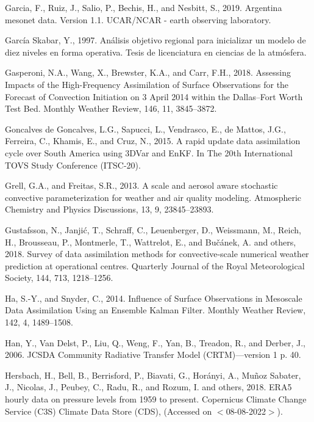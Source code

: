 \documentclass[12pt,oneside]{reedthesis}
\begin{document}
\leavevmode\hypertarget{ref-garcia2019}{}%
Garcia, F., Ruiz, J., Salio, P., Bechis, H., and Nesbitt, S., 2019. Argentina mesonet data. Version 1.1. UCAR/NCAR - earth observing laboratory.

\leavevmode\hypertarget{ref-garciaskabar1997}{}%
García Skabar, Y., 1997. Análisis objetivo regional para inicializar un modelo de diez niveles en forma operativa. Tesis de licenciatura en ciencias de la atmósfera.

\leavevmode\hypertarget{ref-gasperoni2018}{}%
Gasperoni, N.A., Wang, X., Brewster, K.A., and Carr, F.H., 2018. Assessing Impacts of the High-Frequency Assimilation of Surface Observations for the Forecast of Convection Initiation on 3 April 2014 within the Dallas--Fort Worth Test Bed. Monthly Weather Review, 146, 11, 3845--3872.

\leavevmode\hypertarget{ref-goncalvesdegoncalves2015}{}%
Goncalves de Goncalves, L.G., Sapucci, L., Vendrasco, E., de Mattos, J.G., Ferreira, C., Khamis, E., and Cruz, N., 2015. A rapid update data assimilation cycle over South America using 3DVar and EnKF. In The 20th International TOVS Study Conference (ITSC-20).

\leavevmode\hypertarget{ref-grell2013}{}%
Grell, G.A., and Freitas, S.R., 2013. A scale and aerosol aware stochastic convective parameterization for weather and air quality modeling. Atmospheric Chemistry and Physics Discussions, 13, 9, 23845--23893.

\leavevmode\hypertarget{ref-gustafsson2018}{}%
Gustafsson, N., Janjić, T., Schraff, C., Leuenberger, D., Weissmann, M., Reich, H., Brousseau, P., Montmerle, T., Wattrelot, E., and Bučánek, A. and others, 2018. Survey of data assimilation methods for convective‐scale numerical weather prediction at operational centres. Quarterly Journal of the Royal Meteorological Society, 144, 713, 1218--1256.

\leavevmode\hypertarget{ref-ha2014}{}%
Ha, S.-Y., and Snyder, C., 2014. Influence of Surface Observations in Mesoscale Data Assimilation Using an Ensemble Kalman Filter. Monthly Weather Review, 142, 4, 1489--1508.

\leavevmode\hypertarget{ref-han2006}{}%
Han, Y., Van Delst, P., Liu, Q., Weng, F., Yan, B., Treadon, R., and Derber, J., 2006. JCSDA Community Radiative Transfer Model (CRTM)---version 1 p. 40.

\leavevmode\hypertarget{ref-era5pressure}{}%
Hersbach, H., Bell, B., Berrisford, P., Biavati, G., Horányi, A., Muñoz Sabater, J., Nicolas, J., Peubey, C., Radu, R., and Rozum, I. and others, 2018. ERA5 hourly data on pressure levels from 1959 to present. Copernicus Climate Change Service (C3S) Climate Data Store (CDS), (Accessed on \(<\)08-08-2022\(>\)).
\end{document}

